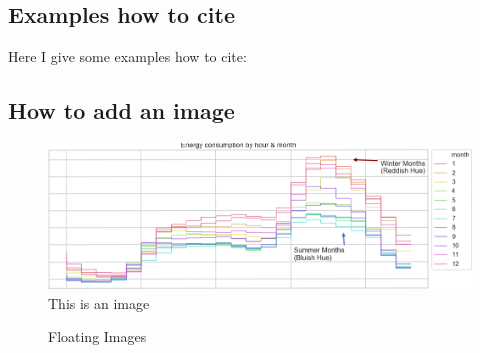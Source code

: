 \subsection*{Examples how to cite}

Here I give some examples how to cite:
\cite{moore_campylobacter_2005}
\parencite{moore_campylobacter_2005} 
\textcite{moore_campylobacter_2005}
\citeauthor{moore_campylobacter_2005}

\subsection*{How to add an image}

\begin{figure}[!ht]
	\centering
	\includegraphics[width=\textwidth]{images/testimage1}
	\caption{This is an image}
	\label{fig:testimage1}
\end{figure}

\begin{figure}[!ht]
	\centering
	\caption{Floating Images}%
	\label{fig:floatimage}%
\end{figure}
\iffalse

